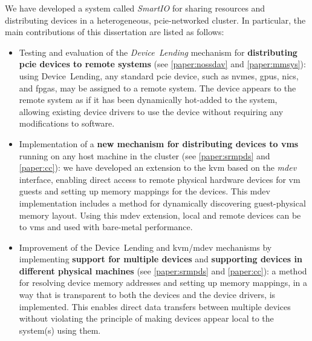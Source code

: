 We have developed a system called \emph{SmartIO} for sharing resources and distributing devices in a heterogeneous, \gls{pcie}-networked cluster.
%
In particular, the main contributions of this dissertation are listed as follows:
\begin{itemize}
    \item Testing and evaluation of the \emph{Device~Lending} mechanism for \textbf{distributing \gls{pcie} devices to remote systems} (see \cref{paper:nossdav} and \cref{paper:mmsys}): 
        using Device~Lending, any standard \gls{pcie} device, such as \glspl{nvme}, \glspl{gpu}, \glspl{nic}, and \glspl{fpga}, may be assigned to a remote system. 
        The device appears to the remote system as if it has been dynamically hot-added to the system, allowing existing device drivers to use the device without requiring any modifications to software.

    \item Implementation of a \textbf{new mechanism for distributing devices to \glspl{vm}} running on any host machine in the cluster (see \cref{paper:srmpds} and \cref{paper:cc}): 
        we have developed an extension to the \gls{kvm} based on the \emph{\gls{mdev}} interface, enabling direct access to remote physical hardware devices for \gls{vm} guests and setting up memory mappings for the devices. 
        This \gls{mdev} implementation includes a method for dynamically discovering guest-physical memory layout. Using this \gls{mdev} extension, local and remote devices can be  to \glspl{vm} and used with bare-metal performance.
	
    \item Improvement of the Device~Lending and \gls{kvm}/\gls{mdev} mechanisms by implementing \textbf{support for multiple devices} and \textbf{supporting devices in different physical machines} (see \cref{paper:srmpds} and \cref{paper:cc}):
        a method for resolving device memory addresses and setting up memory mappings, in a way that is transparent to both the devices and the device drivers, is implemented. 
        This enables direct data transfers between multiple devices without violating the principle of making devices appear local to the system(s) using them.


\end{itemize}
